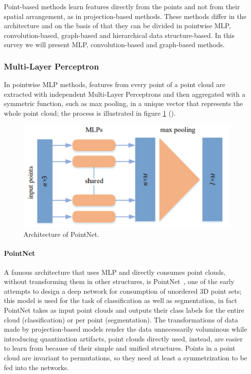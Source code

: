 Point-based methods learn features directly from the points and not from their spatial arrangement, as in projection-based methods. These methods differ in the architecture and on the basis of that they can be divided in pointwise MLP, convolution-based, graph-based and hierarchical data structure-based. In this survey we will present MLP, convolution-based and graph-based methods.

\subsubsection{Multi-Layer Perceptron}

In pointwise MLP methods, features from every point of a point cloud are extracted with independent Multi-Layer Perceptrons and then aggregated with a symmetric function, such as max pooling, in a unique vector that represents the whole point cloud; the process is illustrated in figure \ref{fig:mlp} (\cite{guo2020deep}). 

\begin{figure}
    \includegraphics[width=1\linewidth]{images/mlp.png} 
    \caption{Architecture of PointNet.}
    \label{fig:mlp}
\end{figure}

\paragraph{PointNet}
\label{par:pointnet}

A famous architecture that uses MLP and directly consumes point clouds, without transforming them in other structures, is PointNet~\cite{qi2017pointnet}, one of the early attempts to design a deep network for consumption of unordered 3D point sets; this model is used for the task of classification as well as segmentation, in fact PointNet takes as input point clouds and outputs their class labels for the entire cloud (classification) or per point (segmentation). The transformations of data made by projection-based models render the data unnecessarily voluminous while introducing quantization artifacts, point clouds directly used, instead, are easier to learn from because of their simple and unified structures. Points in a point cloud are invariant to permutations, so they need at least a symmetrization to be fed into the networks.

